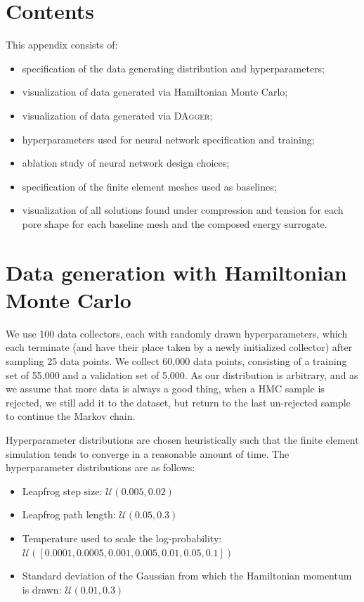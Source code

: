 \section{Contents}
This appendix consists of:
\begin{itemize}
  \item specification of the data generating distribution and hyperparameters;
  \item visualization of data generated via Hamiltonian Monte Carlo;
  \item visualization of data generated via \textsc{DAgger};
  \item hyperparameters used for neural network specification and training;
  \item ablation study of neural network design choices;
  \item specification of the finite element meshes used as baselines;
  \item visualization of all solutions found under compression and tension
  for each pore shape for each baseline mesh and the composed energy surrogate.
\end{itemize}

\clearpage
\section{Data generation with Hamiltonian Monte Carlo}
We use 100 data collectors, each with randomly drawn hyperparameters, which
each terminate (and have their place taken by a newly initialized collector)
after sampling 25 data points.
We collect 60,000 data points, consisting of a training set of 55,000 and a validation set of 5,000.
As our distribution is arbitrary, and as we assume that more data is always a good thing, when a HMC sample is rejected, we still add it to the dataset, but return to the last un-rejected sample to continue the Markov chain.

Hyperparameter distributions are chosen heuristically such that the finite element simulation tends to converge in a reasonable amount of time.
The hyperparameter distributions are as follows:

\begin{itemize}
\item Leapfrog step size: $\mathcal{U}(0.005, 0.02)$
\item Leapfrog path length: $\mathcal{U}(0.05, 0.3)$
\item Temperature used to scale the log-probability: $\mathcal{U}([0.0001,0.0005,0.001,0.005,0.01,0.05,0.1])$
\item Standard deviation of the Gaussian from which the Hamiltonian momentum is drawn: $\mathcal{U}(0.01, 0.3)$
\end{itemize}

